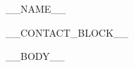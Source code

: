 \documentclass[10.5pt]{article}
\begin{document}
\centerline{\Huge __NAME__}

\vspace{5pt}

\centerline{__CONTACT_BLOCK__}

\vspace{-10pt}

__BODY__
\end{document}
